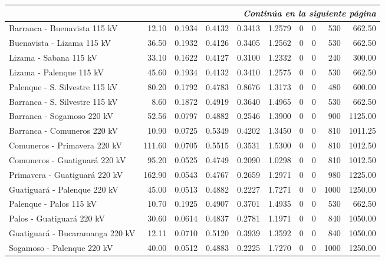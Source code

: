 \documentclass[12pt]{article}
\begin{document}
\begin{center}
\begin{longtable}{|p{5.8cm}|r|r|r|r|r|r|r|r|r|}
\hline
\multicolumn{10}{|r|}{\textit{Continúa en la siguiente página}} \\
\hline
\endfoot

\hline
\endlastfoot

\hline
\endlastfoot

Barranca - Buenavista 115 kV & 12.10 & 0.1934 & 0.4132 & 0.3413 & 1.2579 & 0 & 0 & 530 & 662.50 \\
\hline
Buenavista - Lizama 115 kV & 36.50 & 0.1932 & 0.4126 & 0.3405 & 1.2562 & 0 & 0 & 530 & 662.50 \\
\hline
Lizama - Sabana 115 kV & 33.10 & 0.1622 & 0.4127 & 0.3100 & 1.2332 & 0 & 0 & 240 & 300.00 \\
\hline
Lizama - Palenque 115 kV & 45.60 & 0.1934 & 0.4132 & 0.3410 & 1.2575 & 0 & 0 & 530 & 662.50 \\
\hline
Palenque - S. Silvestre 115 kV & 80.20 & 0.1792 & 0.4783 & 0.8676 & 1.3173 & 0 & 0 & 480 & 600.00 \\
\hline
Barranca - S. Silvestre 115 kV & 8.60 & 0.1872 & 0.4919 & 0.3640 & 1.4965 & 0 & 0 & 530 & 662.50 \\
\hline
Barranca - Sogamoso 220 kV & 52.56 & 0.0797 & 0.4882 & 0.2546 & 1.3900 & 0 & 0 & 900 & 1125.00 \\
\hline
Barranca - Comuneros 220 kV & 10.90 & 0.0725 & 0.5349 & 0.4202 & 1.3450 & 0 & 0 & 810 & 1011.25 \\
\hline
Comuneros - Primavera 220 kV & 111.60 & 0.0705 & 0.5515 & 0.3531 & 1.5300 & 0 & 0 & 810 & 1012.50 \\
\hline
Comuneros - Guatiguará 220 kV & 95.20 & 0.0525 & 0.4749 & 0.2090 & 1.0298 & 0 & 0 & 810 & 1012.50 \\
\hline
Primavera - Guatiguará 220 kV & 162.90 & 0.0543 & 0.4767 & 0.2659 & 1.2971 & 0 & 0 & 980 & 1225.00 \\
\hline
Guatiguará - Palenque 220 kV & 45.00 & 0.0513 & 0.4882 & 0.2227 & 1.7271 & 0 & 0 & 1000 & 1250.00 \\
\hline
Palenque - Palos 115 kV & 10.70 & 0.1925 & 0.4907 & 0.3701 & 1.4935 & 0 & 0 & 530 & 662.50 \\
\hline
Palos - Guatiguará 220 kV & 30.60 & 0.0614 & 0.4837 & 0.2781 & 1.1971 & 0 & 0 & 840 & 1050.00 \\
\hline
Guatiguará - Bucaramanga 220 kV & 12.11 & 0.0710 & 0.5120 & 0.3939 & 1.3592 & 0 & 0 & 840 & 1050.00 \\
\hline
Sogamoso - Palenque 220 kV & 40.00 & 0.0512 & 0.4883 & 0.2225 & 1.7270 & 0 & 0 & 1000 & 1250.00 \\

\end{longtable}
\end{center}
\end{document}
